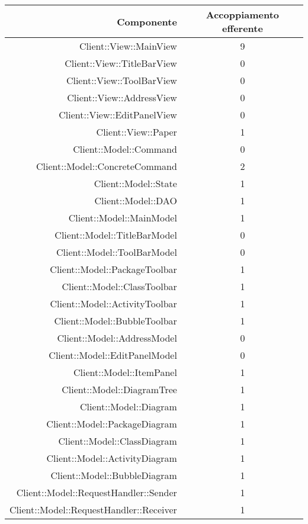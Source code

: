 \documentclass[../PianoDiQualifica.tex]{subfiles}
\begin{document}
				\begin{longtable}{|r|c|}
					\hline
					\rowcolor{blue!30}\textbf{Componente} & \textbf{Accoppiamento efferente} \\
					\hline
					\endhead
					Client::View::MainView & 9 \\ \hline
					Client::View::TitleBarView & 0 \\ \hline
					Client::View::ToolBarView & 0 \\ \hline
					Client::View::AddressView & 0 \\ \hline
					Client::View::EditPanelView & 0 \\ \hline
					Client::View::Paper & 1 \\ \hline
					Client::Model::Command & 0\\ \hline
					Client::Model::ConcreteCommand & 2 \\ \hline
					Client::Model::State & 1 \\ \hline
					Client::Model::DAO & 1 \\ \hline
					Client::Model::MainModel & 1 \\ \hline
					Client::Model::TitleBarModel & 0 \\ \hline
					Client::Model::ToolBarModel & 0 \\ \hline
					Client::Model::PackageToolbar & 1 \\ \hline
					Client::Model::ClassToolbar & 1 \\ \hline
					Client::Model::ActivityToolbar & 1 \\ \hline
					Client::Model::BubbleToolbar & 1 \\ \hline
					Client::Model::AddressModel & 0 \\ \hline
					Client::Model::EditPanelModel & 0 \\ \hline
					Client::Model::ItemPanel & 1 \\ \hline
					Client::Model::DiagramTree & 1 \\ \hline
					Client::Model::Diagram & 1 \\ \hline
					Client::Model::PackageDiagram & 1 \\ \hline
					Client::Model::ClassDiagram & 1 \\ \hline
					Client::Model::ActivityDiagram & 1 \\ \hline
					Client::Model::BubbleDiagram & 1 \\ \hline
					Client::Model::RequestHandler::Sender & 1 \\ \hline
					Client::Model::RequestHandler::Receiver & 1 \\ \hline

\end{longtable}
\end{document}
